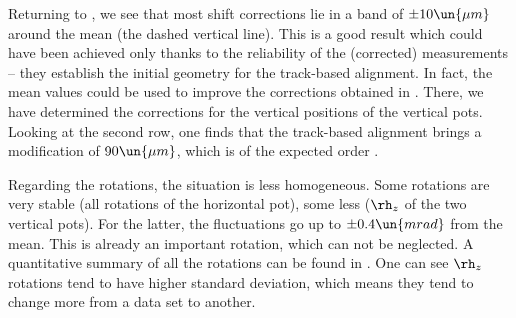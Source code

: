 Returning to , we see that most shift corrections lie in a band of $\pm 10\un{\mu m}$ around the mean (the dashed vertical line). This is a good result which could have been achieved only thanks to the reliability of the (corrected)  measurements -- they establish the initial geometry for the track-based alignment. In fact, the mean values could be used to improve the corrections obtained in . There, we have determined the corrections for the vertical positions of the vertical pots. Looking at the second row, one finds that the track-based alignment brings a modification of $90\un{\mu m}$, which is of the expected order .

Regarding the rotations, the situation is less homogeneous. Some rotations are very stable (all rotations of the horizontal pot), some less ($\rh_z$ of the two vertical pots). For the latter, the fluctuations go up to $\pm 0.4\un{mrad}$ from the mean. This is already an important rotation, which can not be neglected. A quantitative summary of all the  rotations can be found in . One can see $\rh_z$ rotations tend to have higher standard deviation, which means they tend to change more from a data set to another.


